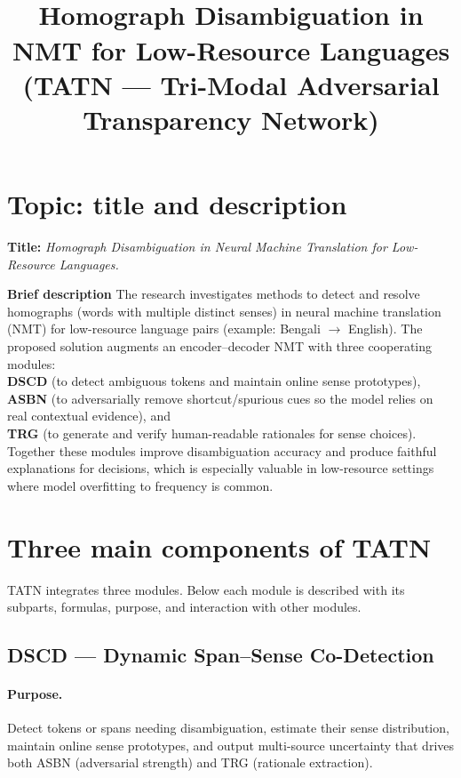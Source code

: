 \documentclass[11pt]{article}
\title{\\ Homograph Disambiguation in NMT for Low-Resource Languages\\(TATN — Tri-Modal Adversarial Transparency Network)}
\date{}
\begin{document}
\maketitle



\bigskip

\section{Topic: title and description}
\textbf{Title:} \emph{Homograph Disambiguation in Neural Machine Translation for Low-Resource Languages.}

\textbf{Brief description}  
The research investigates methods to detect and resolve homographs (words with multiple distinct senses) in neural machine translation (NMT) for low-resource language pairs (example: Bengali $\rightarrow$ English). The proposed solution augments an encoder–decoder NMT with three cooperating modules:\\ \textbf{DSCD} (to detect ambiguous tokens and maintain online sense prototypes),\\ \textbf{ASBN} (to adversarially remove shortcut/spurious cues so the model relies on real contextual evidence), and\\ \textbf{TRG} (to generate and verify human-readable rationales for sense choices). Together these modules improve disambiguation accuracy and produce faithful explanations for decisions, which is especially valuable in low-resource settings where model overfitting to frequency is common.

\section{Three main components of TATN}

TATN integrates three modules. Below each module is described with its subparts, formulas, purpose, and interaction with other modules.

\subsection{DSCD — Dynamic Span–Sense Co-Detection}
\paragraph{Purpose.} Detect tokens or spans needing disambiguation, estimate their sense distribution, maintain online sense prototypes, and output multi-source uncertainty that drives both ASBN (adversarial strength) and TRG (rationale extraction).
\end{document}
